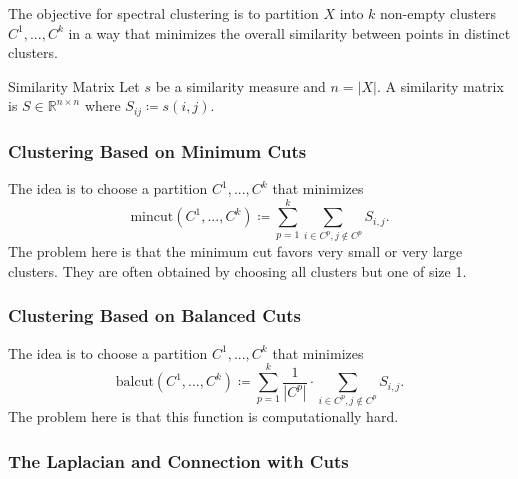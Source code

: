\documentclass{panikzettel}
\begin{document}

\begin{halfboxl}
\vspace{-\baselineskip}
	The objective for spectral clustering is to partition $X$ into $k$ non-empty clusters $C^1,...,C^k$ in a way that minimizes the overall similarity between points in distinct clusters.
\end{halfboxl}
\begin{halfboxr}
\vspace{-\baselineskip}
\begin{defi}{Similarity Matrix}
Let $s$ be a similarity measure and $n=|X|$. A similarity matrix is $S\in\mathbb{R}^{n\times n}$ where $S_{ij}\coloneqq s(i,j)$.
\end{defi}
\end{halfboxr}

\subsubsection{Clustering Based on Minimum Cuts}
The idea is to choose a partition $C^1,..., C^k$ that minimizes
\[
\text{mincut}(C^1,...,C^k)\coloneqq \sum_{p=1}^k \sum_{i\in C^p, j\notin C^p} S_{i,j}.
\]
The problem here is that the minimum cut favors very small or very large clusters. They are often obtained by choosing all clusters but one of size 1.

\subsubsection{Clustering Based on Balanced Cuts}
The idea is to choose a partition $C^1,..., C^k$ that minimizes
\[
\text{balcut}(C^1,..., C^k)\coloneqq \sum_{p=1}^k \frac{1}{|C^p|}\cdot \sum_{i\in C^p, j\notin C^p} S_{i,j}.
\]
The problem here is that this function is computationally hard.

\subsubsection{The Laplacian and Connection with Cuts}
\end{document}
